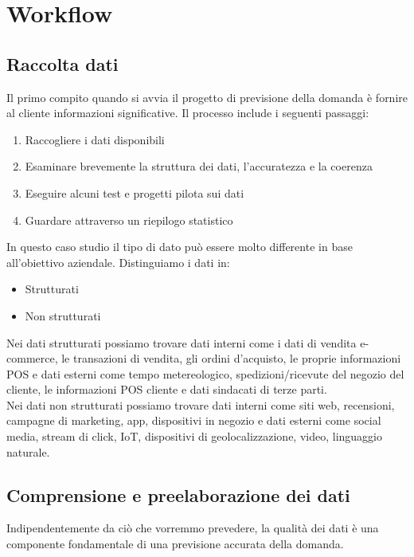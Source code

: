 \documentclass[12pt,a4paper]{report}
\begin{document}
\section{Workflow}

\subsection{Raccolta dati}
Il primo compito quando si avvia il progetto di previsione della domanda è fornire al cliente informazioni significative. Il processo include i seguenti passaggi:
\begin{enumerate}
    \item Raccogliere i dati disponibili
    \item Esaminare brevemente la struttura dei dati, l'accuratezza e la coerenza
    \item Eseguire alcuni test e progetti pilota sui dati
    \item Guardare attraverso un riepilogo statistico
\end{enumerate}

In questo caso studio il tipo di dato può essere molto differente in base all'obiettivo aziendale. Distinguiamo i dati in:
\begin{itemize}
    \item Strutturati
    \item Non strutturati
\end{itemize}

Nei dati strutturati possiamo trovare dati interni come i dati di vendita e-commerce, le transazioni di vendita, gli ordini d'acquisto, le proprie informazioni POS e dati esterni come tempo metereologico, spedizioni/ricevute del negozio del cliente, le informazioni POS cliente e dati sindacati di terze parti.\\
Nei dati non strutturati possiamo trovare dati interni come siti web, recensioni, campagne di marketing, app, dispositivi in negozio e dati esterni come social media, stream di click, IoT, dispositivi di geolocalizzazione, video, linguaggio naturale.\\

\subsection{Comprensione e preelaborazione dei dati}
Indipendentemente da ciò che vorremmo prevedere, la qualità dei dati è una componente fondamentale di una previsione accurata della domanda.
\end{document}
